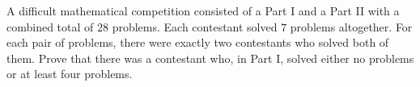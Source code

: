 A difficult mathematical competition consisted of a Part I and a Part II with a combined total of $28$ problems. Each contestant solved $7$ problems altogether. For each pair of problems, there were exactly two contestants who solved both of them. Prove that there was a contestant who, in Part I, solved either no problems or at least four problems.